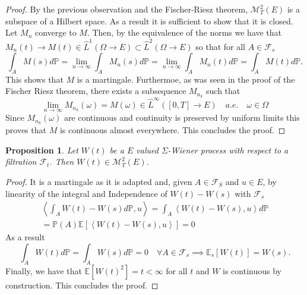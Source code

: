 \documentclass[12pt]{article}
\newcommand{\br}[1]{\left\langle#1\right\rangle}
\newcommand{\ff}{{\mathcal F}}
\newcommand{\PP}{{\mathbb P}}
\newcommand{\EE}{{\mathbb E}}
\newtheorem{proposition}{Proposition}
\begin{document}
\begin{proof}
	By the previous observation  and the Fischer-Riesz theorem, $\mathcal{M}_T^2(E)$ is a subspace of a Hilbert space. As a result it is sufficient to show that it is closed. Let $M_n$ converge to $M$. Then, by the equivalence of the norms we have that $M_n(t)\to M(t)\in \hat{L}^1(\Omega\to E)\subset \hat{L}^2(\Omega\to E)$ so that for all $A\in\mathcal{F}_s$
	\begin{equation*}
		\int_A M(s)d\mathbb{P}=\lim_{n\to\infty}\int_A M_n(s)d\mathbb{P}=\lim_{n\to\infty}\int_A M_n(t)d\mathbb{P}=\int_A M(t)d\mathbb{P}.
	\end{equation*}
	This shows that $M$ is a martingale. Furthermoe, as was seen in the proof of the Fischer Riesz theorem, there exists a subsequence $M_{n_k}$ such that
	\begin{equation*}
		\lim_{n\to\infty}{M_{n_k}}(\omega)=M(\omega)\in \hat{L}^\infty([0,T]\to E)\quad a.e.\quad \omega\in\Omega
	\end{equation*}
	Since $M_{n_k}(\omega)$ are continuous and continuity is preserved by uniform limits this proves that $M$ is continuous almost everywhere. This concludes the proof.
\end{proof}
\begin{proposition}
	Let $W(t)$ be a $E$ valued $\Sigma$-Wiener process with respect to a filtration $\mathcal{F}_t$. Then $W(t)\in \mathcal{M}_T^2(E)$.
\end{proposition}
\begin{proof}
	It is a martingale as it is adapted and, given $A\in\ff_S$ and $u\in E$, by linearity of the integral and Independence of $W(t)-W(s)$ with $\ff_s$
	\begin{multline*}
		\br{\int_A W(t)-W(s)d\PP,u}=\int_A \br{W(t)-W(s),u}d\PP\\=
		\PP(A)\EE[\br{W(t)-W(s),u}]=0
	\end{multline*}
	As a result
	\begin{equation*}
		\int_A W(t)d\PP=\int_A W(s)d\PP=0\quad \forall A\in\ff_s\implies \EE_s[W(t)]=W(s).
	\end{equation*}
	Finally, we have that $\EE[W(t)^2]=t<\infty$ for all $t$ and $W$ is continuous by construction. This concludes the proof.
\end{proof}
\end{document}
